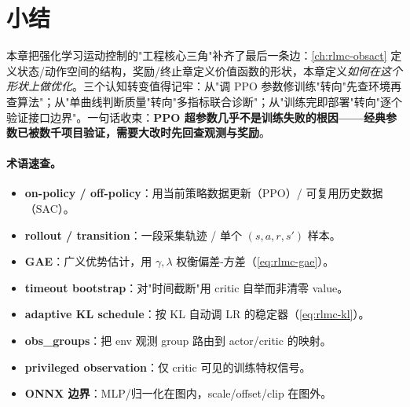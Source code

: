 \section*{小结}
\label{sec:rlmc-train-summary}

本章把强化学习运动控制的"工程核心三角"补齐了最后一条边：\cref{ch:rlmc-obsact} 定义状态/动作空间的结构，奖励/终止章定义价值函数的形状，本章定义\emph{如何在这个形状上做优化}。三个认知转变值得记牢：从"调 PPO 参数修训练"转向"先查环境再查算法"；从"单曲线判断质量"转向"多指标联合诊断"；从"训练完即部署"转向"逐个验证接口边界"。一句话收束：\textbf{PPO 超参数几乎不是训练失败的根因——经典参数已被数千项目验证，需要大改时先回查观测与奖励}。

\paragraph{术语速查。}
\begin{itemize}
  \item \textbf{on-policy / off-policy}：用当前策略数据更新（PPO）/ 可复用历史数据（SAC）。
  \item \textbf{rollout / transition}：一段采集轨迹 / 单个 $(s,a,r,s')$ 样本。
  \item \textbf{GAE}：广义优势估计，用 $\gamma,\lambda$ 权衡偏差-方差（\cref{eq:rlmc-gae}）。
  \item \textbf{timeout bootstrap}：对"时间截断"用 critic 自举而非清零 value。
  \item \textbf{adaptive KL schedule}：按 KL 自动调 LR 的稳定器（\cref{eq:rlmc-kl}）。
  \item \textbf{obs\_groups}：把 env 观测 group 路由到 actor/critic 的映射。
  \item \textbf{privileged observation}：仅 critic 可见的训练特权信号。
  \item \textbf{ONNX 边界}：MLP/归一化在图内，scale/offset/clip 在图外。
\end{itemize}

